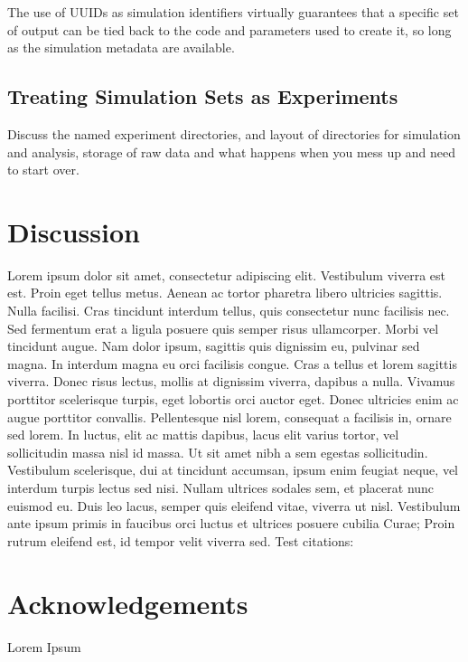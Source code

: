 \documentclass[preprint,times,authoryear,10pt]{elsarticle}
\begin{document}
The use of UUIDs as simulation identifiers virtually guarantees that a
specific set of output can be tied back to the code and parameters used
to create it, so long as the simulation metadata are available.

\subsection{Treating Simulation Sets as
Experiments}\label{treating-simulation-sets-as-experiments}

Discuss the named experiment directories, and layout of directories for
simulation and analysis, storage of raw data and what happens when you
mess up and need to start over.

\section{Discussion}\label{discussion}

Lorem ipsum dolor sit amet, consectetur adipiscing elit. Vestibulum
viverra est est. Proin eget tellus metus. Aenean ac tortor pharetra
libero ultricies sagittis. Nulla facilisi. Cras tincidunt interdum
tellus, quis consectetur nunc facilisis nec. Sed fermentum erat a ligula
posuere quis semper risus ullamcorper. Morbi vel tincidunt augue. Nam
dolor ipsum, sagittis quis dignissim eu, pulvinar sed magna. In interdum
magna eu orci facilisis congue. Cras a tellus et lorem sagittis viverra.
Donec risus lectus, mollis at dignissim viverra, dapibus a nulla.
Vivamus porttitor scelerisque turpis, eget lobortis orci auctor eget.
Donec ultricies enim ac augue porttitor convallis. Pellentesque nisl
lorem, consequat a facilisis in, ornare sed lorem. In luctus, elit ac
mattis dapibus, lacus elit varius tortor, vel sollicitudin massa nisl id
massa. Ut sit amet nibh a sem egestas sollicitudin. Vestibulum
scelerisque, dui at tincidunt accumsan, ipsum enim feugiat neque, vel
interdum turpis lectus sed nisi. Nullam ultrices sodales sem, et
placerat nunc euismod eu. Duis leo lacus, semper quis eleifend vitae,
viverra ut nisl. Vestibulum ante ipsum primis in faucibus orci luctus et
ultrices posuere cubilia Curae; Proin rutrum eleifend est, id tempor
velit viverra sed. Test citations:
\citep{BR1985, CF1981, national2012Assessing, Ewens2004, xie2013dynamic}

\section{Acknowledgements}\label{acknowledgements}

Lorem Ipsum





\end{document}
